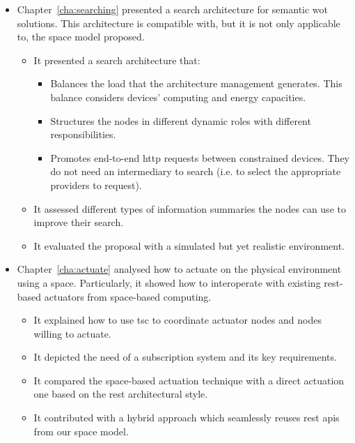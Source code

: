 \begin{itemize}
  \item Chapter~\ref{cha:searching} presented a search architecture for semantic \ac{wot} solutions.
        This architecture is compatible with, but it is not only applicable to, the space model proposed.
    \begin{itemize}
      \item It presented a search architecture that:
      \begin{itemize}
	\item Balances the load that the architecture management generates.
	      This balance considers devices' computing and energy capacities.
	\item Structures the nodes in different dynamic roles with different responsibilities. %
	\item Promotes end-to-end \ac{http} requests between constrained devices.
	      They do not need an intermediary to search (i.e. to select the appropriate providers to request). %
      \end{itemize}
      \item It assessed different types of information summaries the nodes can use to improve their search.
      \item It evaluated the proposal with a simulated but yet realistic environment.
    \end{itemize}
    
  \item Chapter~\ref{cha:actuate} analysed how to actuate on the physical environment using a space. %
	Particularly, it showed how to interoperate with existing \ac{rest}-based actuators from space-based computing.
    \begin{itemize}
      \item It explained how to use \ac{tsc} to coordinate actuator nodes and nodes willing to actuate.
      \item It depicted the need of a subscription system and its key requirements.
      \item It compared the space-based actuation technique with a direct actuation one based on the \ac{rest} architectural style. %
      \item It contributed with a hybrid approach which seamlessly reuses \ac{rest} \acp{api} from our space model.
    \end{itemize}
  

\end{itemize}

